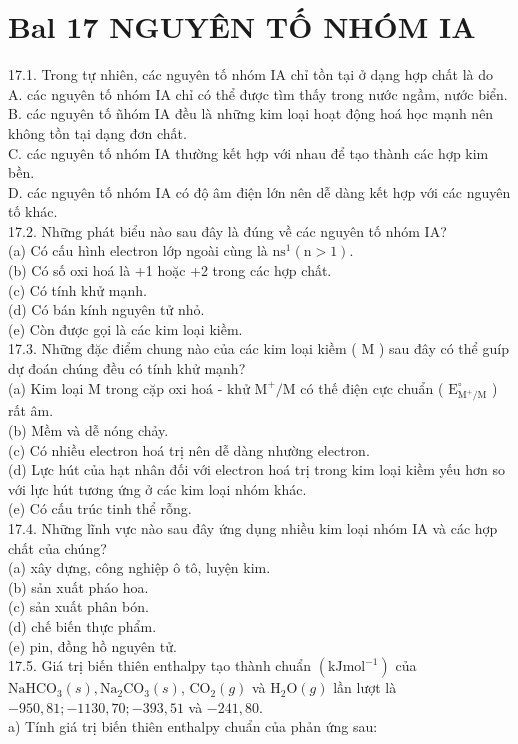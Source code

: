 \documentclass[10pt]{article}
\begin{document}
\section*{Bal 17 NGUYÊN TỐ NHÓM IA}
17.1. Trong tự nhiên, các nguyên tố nhóm IA chỉ tồn tại ở dạng hợp chất là do\\
A. các nguyên tố nhóm IA chỉ có thể được tìm thấy trong nước ngầm, nước biển.\\
B. các nguyên tố ñhóm IA đều là những kim loại hoạt động hoá học mạnh nên không tồn tại dạng đơn chất.\\
C. các nguyên tố nhóm IA thường kết hợp với nhau để tạo thành các hợp kim bền.\\
D. các nguyên tố nhóm IA có độ âm điện lớn nên dễ dàng kết hợp với các nguyên tố khác.\\
17.2. Những phát biểu nào sau đây là đúng về các nguyên tố nhóm IA?\\
(a) Có cấu hình electron lớp ngoài cùng là $\mathrm{ns}^{1}(\mathrm{n}>1)$.\\
(b) Có số oxi hoá là +1 hoặc +2 trong các hợp chất.\\
(c) Có tính khử mạnh.\\
(d) Có bán kính nguyên tử nhỏ.\\
(e) Còn được gọi là các kim loại kiềm.\\
17.3. Những đặc điểm chung nào của các kim loại kiềm ( M ) sau đây có thể guíp dự đoán chúng đều có tính khử mạnh?\\
(a) Kim loại M trong cặp oxi hoá - khử $\mathrm{M}^{+} / \mathrm{M}$ có thế điện cực chuẩn ( $\mathrm{E}_{\mathrm{M}^{+} / \mathrm{M}}^{\circ}$ ) rất âm.\\
(b) Mềm và dễ nóng chảy.\\
(c) Có nhiều electron hoá trị nên dễ dàng nhường electron.\\
(d) Lực hút của hạt nhân đối với electron hoá trị trong kim loại kiềm yếu hơn so với lực hút tương ứng ở các kim loại nhóm khác.\\
(e) Có cấu trúc tinh thể rỗng.\\
17.4. Những lĩnh vực nào sau đây ứng dụng nhiều kim loại nhóm IA và các hợp chất của chúng?\\
(a) xây dựng, công nghiệp ô tô, luyện kim.\\
(b) sản xuất pháo hoa.\\
(c) sản xuất phân bón.\\
(d) chế biến thực phẩm.\\
(e) pin, đồng hồ nguyên tử.\\
17.5. Giá trị biến thiên enthalpy tạo thành chuẩn $\left(\mathrm{kJ} \mathrm{mol}^{-1}\right)$ của $\mathrm{NaHCO}_{3}(s), \mathrm{Na}_{2} \mathrm{CO}_{3}(s)$, $\mathrm{CO}_{2}(g)$ và $\mathrm{H}_{2} \mathrm{O}(g)$ lần lượt là $-950,81 ;-1130,70 ;-393,51$ và $-241,80$.\\
a) Tính giá trị biến thiên enthalpy chuẩn của phản ứng sau:
\end{document}
